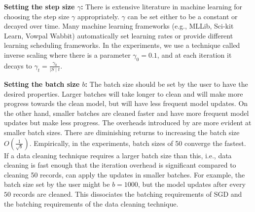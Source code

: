 \vspace{0.25em}

\noindent\textbf{ Setting the step size $\gamma$: } There is extensive literature in machine learning for choosing the step size $\gamma$ appropriately. $\gamma$ can be set either to be a constant or decayed over time. Many machine learning frameworks (e.g., MLLib, Sci-kit Learn, Vowpal Wabbit) automatically set learning rates or provide different learning scheduling frameworks. 
In the experiments, we use a technique called inverse scaling where there is a parameter $\gamma_0=0.1$, and at each iteration it decays to $\gamma_t = \frac{\gamma_0}{\mid S \mid t}$. 

\vspace{0.25em}

\noindent\textbf{ Setting the batch size $b$: } The batch size should be set by the user to have the desired properties.
Larger batches will take longer to clean and will make more progress towards the clean model, but will have less frequent model updates.
On the other hand, smaller batches are cleaned faster and have more frequent model updates but make less progress.
The overheads introduced by \sys are more evident at smaller batch sizes.
There are diminishing returns to increasing the batch size $O(\frac{1}{\sqrt{b}})$.
Empirically, in the experiments, batch sizes of 50 converge the fastest.
If a data cleaning technique requires a larger batch size than this, i.e., data cleaning is fast enough that the iteration overhead is significant compared to cleaning 50 records, \sys can apply the updates in smaller batches.
For example, the batch size set by the user might be $b=1000$, but the model updates after every $50$ records are cleaned.
This dissociates the batching requirements of SGD and the batching requirements of the data cleaning technique.

